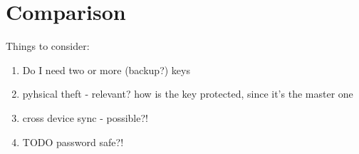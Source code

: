 \chapter{Comparison}
\label{chapter:comparison}

Things to consider:

\begin{enumerate}
	\item Do I need two or more (backup?) keys
	\item pyhsical theft - relevant? how is the key protected, since it's the master one
	\item cross device sync - possible?!
	\item TODO password safe?!
\end{enumerate}